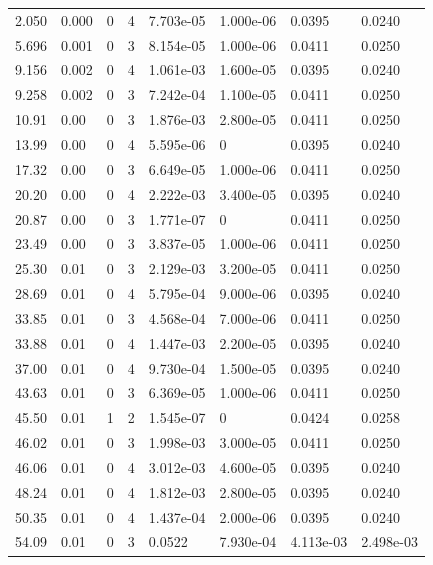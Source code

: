 \documentclass[preview]{standalone}
\begin{document}
{{\begin{tabular}{L{1.2cm}C{1.2cm} C{0.3cm}C{0.5cm} C{1.4cm}C{1.4cm} C{1.4cm}C{1.4cm}}
  2.050  &  0.000  & 0     &  4 &  7.703e-05  & 1.000e-06  & 0.0395 &  0.0240   \\ 
  5.696  &  0.001  & 0     &  3 &  8.154e-05  & 1.000e-06  & 0.0411 &  0.0250   \\ 
  9.156  &  0.002  & 0     &  4 &  1.061e-03  & 1.600e-05  & 0.0395 &  0.0240   \\ 
  9.258  &  0.002  & 0     &  3 &  7.242e-04  & 1.100e-05  & 0.0411 &  0.0250   \\ 
  10.91  &  0.00  & 0     &  3 &  1.876e-03  & 2.800e-05  & 0.0411 &  0.0250   \\ 
  13.99  &  0.00  & 0     &  4 &  5.595e-06  & 0  & 0.0395 &  0.0240   \\ 
  17.32  &  0.00  & 0     &  3 &  6.649e-05  & 1.000e-06  & 0.0411 &  0.0250   \\ 
  20.20  &  0.00  & 0     &  4 &  2.222e-03  & 3.400e-05  & 0.0395 &  0.0240   \\ 
  20.87  &  0.00  & 0     &  3 &  1.771e-07  & 0  & 0.0411 &  0.0250   \\ 
  23.49  &  0.00  & 0     &  3 &  3.837e-05  & 1.000e-06  & 0.0411 &  0.0250   \\ 
  25.30  &  0.01  & 0     &  3 &  2.129e-03  & 3.200e-05  & 0.0411 &  0.0250   \\ 
  28.69  &  0.01  & 0     &  4 &  5.795e-04  & 9.000e-06  & 0.0395 &  0.0240   \\ 
  33.85  &  0.01  & 0     &  3 &  4.568e-04  & 7.000e-06  & 0.0411 &  0.0250   \\ 
  33.88  &  0.01  & 0     &  4 &  1.447e-03  & 2.200e-05  & 0.0395 &  0.0240   \\ 
  37.00  &  0.01  & 0     &  4 &  9.730e-04  & 1.500e-05  & 0.0395 &  0.0240   \\ 
  43.63  &  0.01  & 0     &  3 &  6.369e-05  & 1.000e-06  & 0.0411 &  0.0250   \\ 
  45.50  &  0.01  & 1     &  2 &  1.545e-07  & 0  & 0.0424 &  0.0258   \\ 
  46.02  &  0.01  & 0     &  3 &  1.998e-03  & 3.000e-05  & 0.0411 &  0.0250   \\ 
  46.06  &  0.01  & 0     &  4 &  3.012e-03  & 4.600e-05  & 0.0395 &  0.0240   \\ 
  48.24  &  0.01  & 0     &  4 &  1.812e-03  & 2.800e-05  & 0.0395 &  0.0240   \\ 
  50.35  &  0.01  & 0     &  4 &  1.437e-04  & 2.000e-06  & 0.0395 &  0.0240   \\ 
  54.09  &  0.01  & 0     &  3 &  0.0522  & 7.930e-04  & 4.113e-03 &  2.498e-03   \\ 

\end{tabular}}}
\end{document}
